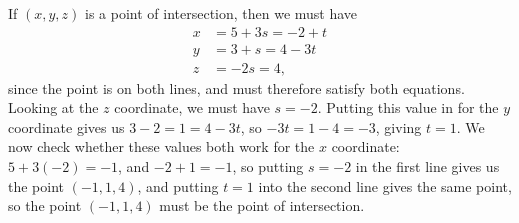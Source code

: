 \documentclass[12pt]{article}
\begin{document}
\begin{enumerate}
\medskip

If $(x,y,z)$ is a point of intersection, then we must have
\begin{align*}
x&=5+3s=-2+t\\
y&=3+s=4-3t\\
z&=-2s=4,
\end{align*}
since the point is on both lines, and must therefore satisfy both equations. Looking at the $z$ coordinate, we must have $s=-2$. Putting this value in for the $y$ coordinate gives us
$3-2=1=4-3t$, so $-3t=1-4=-3$, giving $t=1$. We now check whether these values both work for the $x$ coordinate: $5+3(-2)=-1$, and $-2+1=-1$, so putting $s=-2$ in the first line gives us the point $(-1,1,4)$, and putting $t=1$ into the second line gives the same point, so the point $(-1,1,4)$ must be the point of intersection.

\end{enumerate}


\newpage
\end{document}
